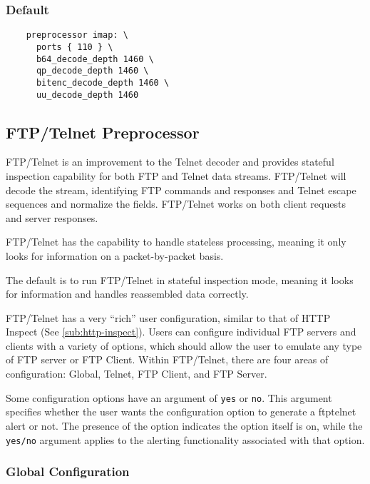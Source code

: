 \documentclass[english]{report}
\newenvironment{note}{
\samepage
    \vspace{10pt}{\textsf{
        {\hspace{7pt}\Huge{$\triangle$\hspace{-12.5pt}{\Large{$^!$}}}}\hspace{5pt}
        {\Large{NOTE}}
    }
    }
   \begin{center}
    \par\vspace{-17pt}

    \begin{lrbox}{\savepar}
    \begin{minipage}[r]{6in}
}
{
    \end{minipage}
    \end{lrbox}
    \fbox{
        \usebox{
            \savepar
	}
    }
    \par\vskip10pt
    \end{center}
}
\newenvironment{note}{
        \begin{rawhtml}
        <p><table border="1"><tr><td><b>
        Note:&nbsp;&nbsp;</b>
        \end{rawhtml}
}{
        \begin{rawhtml}
        </b></td></tr></table></p>
        \end{rawhtml}
}
\begin{document}
\subsubsection{Default}

\begin{verbatim}
	preprocessor imap: \
	  ports { 110 } \
	  b64_decode_depth 1460 \
	  qp_decode_depth 1460 \
	  bitenc_decode_depth 1460 \
	  uu_decode_depth 1460
\end{verbatim}

\subsection{FTP/Telnet Preprocessor}
\label{sub:ftptelnet}

FTP/Telnet is an improvement to the Telnet decoder and provides stateful
inspection capability for both FTP and Telnet data streams.  FTP/Telnet will
decode the stream, identifying FTP commands and responses and Telnet escape
sequences and normalize the fields.  FTP/Telnet works on both client requests
and server responses.

FTP/Telnet has the capability to handle stateless processing, meaning it only
looks for information on a packet-by-packet basis.  

The default is to run FTP/Telnet in stateful inspection mode, meaning it looks
for information and handles reassembled data correctly.

FTP/Telnet has a very ``rich'' user configuration, similar to that of HTTP
Inspect (See \ref{sub:http-inspect}).  Users can configure individual FTP
servers and clients with a variety of options, which should allow the user to
emulate any type of FTP server or FTP Client.  Within FTP/Telnet, there are
four areas of configuration: Global, Telnet, FTP Client, and FTP Server.

\begin{note}

Some configuration options have an argument of \texttt{yes} or \texttt{no}.
This argument specifies whether the user wants the configuration option to
generate a ftptelnet alert or not.  The presence of the option indicates the
option itself is on, while the \texttt{yes/no} argument applies to the alerting
functionality associated with that option.

\end{note}

\subsubsection{Global Configuration}
\end{document}
